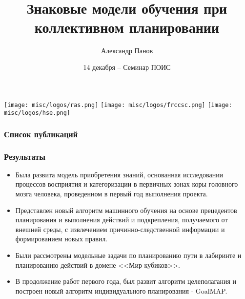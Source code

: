 \documentclass[default]{beamer}
\begin{document}
	
	\title[Обучение в коллективе]{Знаковые модели обучения при коллективном планировании}
	\author[Панов]{Александр Панов}
	\date{14 декабря -- Семинар ПОИС} 
	
	\begin{frame}
		\titlepage
		\centering
		\texttt{[image: misc/logos/ras.png]} \hspace{10pt}
		\texttt{[image: misc/logos/frccsc.png]} \hspace{10pt}
		\texttt{[image: misc/logos/hse.png]}
	\end{frame}


	\begin{frame}
		\frametitle{Список публикаций}
		
		\nocite{*}
		\printbibliography[keyword={fulllist}, resetnumbers=true]
	\end{frame}	

	\begin{frame}
	\frametitle{Результаты}
	
		\begin{itemize}
			\item Была развита модель приобретения знаний, основанная исследовании процессов восприятия и категоризации в первичных зонах коры головного мозга человека, проведенном в первый год выполнения проекта.
			\item Представлен новый алгоритм машинного обучения на основе прецедентов планирования и выполнения действий и подкрепления, получаемого от внешней среды, с извлечением причинно-следственной информации и формированием новых правил. 
			\item Были рассмотрены модельные задачи по планированию пути в лабиринте и планированию действий в домене <<Мир кубиков>>. 
			\item В продолжение работ первого года, был развит алгоритм целеполагания и построен новый алгоритм индивидуального планирования - GoalMAP.
		\end{itemize}
		
	\end{frame}
\end{document}

